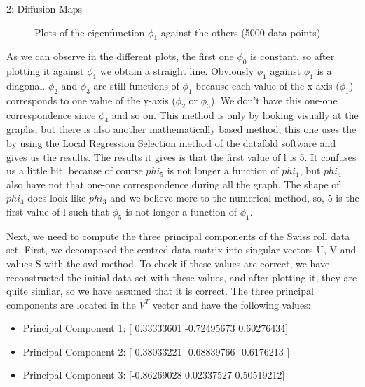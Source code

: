 \documentclass[10pt,a4paper]{article}
\begin{document}
\begin{task}{2: Diffusion Maps}
\begin{figure} [H]
\centering
    \caption{Plots of the eigenfunction \(\phi_1\) against the others (5000 data points)}
    \label{plots}
\end{figure}

As we can observe in the different plots, the first one \(\phi_0\) is constant, so after plotting it against \(\phi_1\) we obtain a straight line. Obviously \(\phi_1\) against \(\phi_1\) is a diagonal. \(\phi_2\) and \(\phi_3\) are still functions of \(\phi_1\) because each value of the x-axis (\(\phi_1\)) corresponds to one value of the y-axis (\(\phi_2\) or \(\phi_3\)). We don't have this one-one correspondence since \(\phi_4\) and so on. This method is only by looking visually at the graphs, but there is also another mathematically based method, this one uses the by using the Local Regression Selection method of the datafold software and gives us the results. The results it gives is that the first value of l is 5. It confuses us a little bit, because of course \(phi_5\) is not longer a function of \(phi_1\), but \(phi_4\) also have not that one-one correspondence during all the graph. The shape of \(phi_4\) does look like \(phi_3\) and we believe more to the numerical method, so, 5 is the first value of l such that \(\phi_5\) is not longer a function of \(\phi_1\). 

Next, we need to compute the three principal components of the Swiss roll data set. First, we decomposed the centred data matrix into singular vectors U, V and values S with the svd method. To check if these values are correct, we have reconstructed the initial data set with these values, and after plotting it, they are quite similar, so we have assumed that it is correct. The three principal components are located in the \(V^T\) vector and have the following values:
\begin{itemize}
  \item Principal Component 1: [ 0.33333601 -0.72495673  0.60276434]
  \item Principal Component 2: [-0.38033221 -0.68839766 -0.6176213 ]
  \item Principal Component 3: [-0.86269028  0.02337527  0.50519212]
\end{itemize} 


\end{task}
\end{document}
